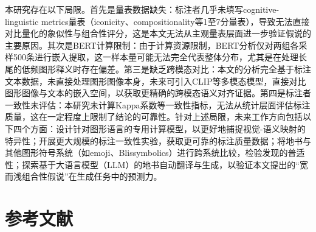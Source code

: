 \documentclass[a4paper,12pt]{article}
\begin{document}
本研究存在以下局限。首先是量表数据缺失：标注者几乎未填写cognitive-linguistic metrics量表（iconicity、compositionality等1至7分量表），导致无法直接对比量化的象似性与组合性评分，这是本文无法从主观量表层面进一步验证假说的主要原因。其次是BERT计算限制：由于计算资源限制，BERT分析仅对两组各采样500条进行嵌入提取，这一样本量可能无法完全代表整体分布，尤其是在处理长尾的低频图形释义时存在偏差。第三是缺乏跨模态对比：本文的分析完全基于标注文本数据，未直接处理图形图像本身，未来可引入CLIP等多模态模型，直接对比图形图像与文本的嵌入空间，以获取更精确的跨模态语义对齐证据。第四是标注者一致性未评估：本研究未计算Kappa系数等一致性指标，无法从统计层面评估标注质量，这在一定程度上限制了结论的可靠性。针对上述局限，未来工作方向包括以下四个方面：设计针对图形语言的专用计算模型，以更好地捕捉视觉-语义映射的特异性；开展更大规模的标注一致性实验，获取更可靠的标注质量数据；将地书与其他图形符号系统（如emoji、Blissymbolics）进行跨系统比较，检验发现的普适性；探索基于大语言模型（LLM）的地书自动翻译与生成，以验证本文提出的``宽而浅组合性假说''在生成任务中的预测力。

\newpage
\section*{参考文献}
\end{document}
